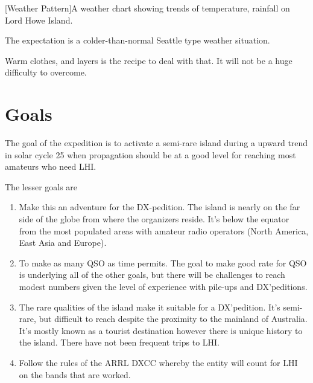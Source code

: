 \documentclass[11pt]{article}
\begin{document}
\vskip2mm
\noindent%
\begin{minipage}{\linewidth}%
\captionsetup{width=0.8\linewidth}
[Weather Pattern]{A weather chart showing trends of 
temperature,
rainfall on Lord Howe Island.}
\label{rain}
\end{minipage}
\vskip3mm

The expectation is a colder-than-normal Seattle type weather situation.
\par
Warm clothes, and layers is the recipe to deal with that.  It will not
be a huge difficulty to overcome.

\section{Goals}

The goal of the expedition is to activate a semi-rare island
during a upward trend in solar cycle 25 when propagation should be
at a good level for reaching most amateurs who need LHI.
\par
The lesser goals are
\begin{enumerate}
\item Make this an adventure for the DX-pedition.  The island is
nearly on the far side of the globe from where the organizers reside.
It's below the equator from the most populated areas with amateur
radio operators (North America, East Asia and Europe).
\item To make as many QSO as time permits.  The
goal to make good rate for QSO is underlying all of the
other goals, but there will be challenges to reach
modest numbers given the level of experience with 
pile-ups and DX'peditions.
\item The rare qualities of the island make it suitable
for a DX'pedition.  It's semi-rare, but difficult to
reach despite the proximity to the mainland of
Australia.  It's mostly known as a tourist destination
however there is unique history to the island.  There
have not been frequent trips to LHI.
\item Follow the rules of the ARRL DXCC whereby
the entity will count for LHI on
the bands that are worked.
\end{enumerate}
\end{document}
